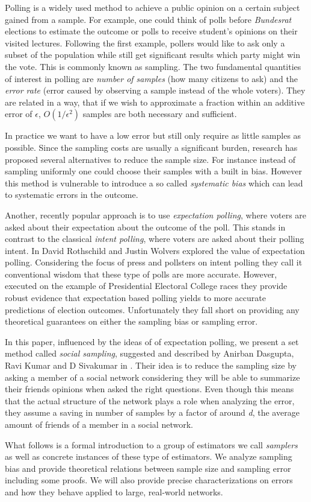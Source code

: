 Polling is a widely used method to achieve a public opinion on a certain subject gained from a sample. For example, one could think of polls before \textit{Bundesrat} elections to estimate the outcome or polls to receive student's opinions on their visited lectures.
Following the first example, pollers would like to ask only a subset of the population while still get significant results which party might win the vote. This is commonly known as sampling.
The two fundamental quantities of interest in polling are \textit{number of samples} (how many citizens to ask) and the \textit{error rate} (error caused by observing a sample instead of the whole voters). They are related in a way, that if we wish to approximate a fraction within an additive error of $\epsilon$, $O(1/\epsilon^{2})$ samples are both necessary and sufficient.

In practice we want to have a low error but still only require as little samples as possible.
Since the sampling costs are usually a significant burden, research has proposed several alternatives to reduce the sample size.
For instance instead of sampling uniformly one could choose their samples with a built in bias.
However this method is vulnerable to introduce a so called \textit{systematic bias} which can lead to systematic errors in the outcome.

Another, recently popular approach is to use \textit{expectation polling}, where voters are asked about their expectation about the outcome of the poll. This stands in contrast to the classical \textit{intent polling}, where voters are asked about their polling intent. In \cite{rothschild2009forecasting} David Rothschild and Justin Wolvers explored the value of expectation polling. Considering the focus of press and pollsters on intent polling they call it conventional wisdom that these type of polls are more accurate. However, executed on the example of Presidential Electoral College races they provide robust evidence that expectation based polling yields to more accurate predictions of election outcomes.
Unfortunately they fall short on providing any theoretical guarantees on either the sampling bias or sampling error.

In this paper, influenced by the ideas of of expectation polling, we present a set method called \textit{social sampling}, suggested and described by Anirban Dasgupta, Ravi Kumar and D Sivakumar in \cite{dasgupta2012social}.
Their idea is to reduce the sampling size by asking a member of a social network considering they will be able to summarize their friends opinions when asked the right questions.
Even though this means that the actual structure of the network plays a role when analyzing the error, they assume a saving in number of samples by a factor of around \textit{d}, the average amount of friends of a member in a social network.

What follows is a formal introduction to a group of estimators we call \textit{samplers} as well as concrete instances of these type of estimators. We analyze sampling bias and provide theoretical relations between sample size and sampling error including some proofs.
We will also provide precise characterizations on errors and how they behave applied to large, real-world networks.
